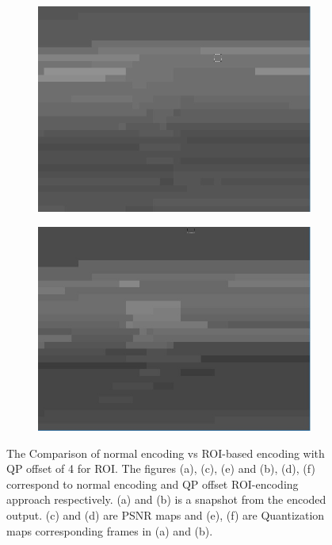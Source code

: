\documentclass[11pt]{article} %
\begin{document}
\begin{figure}
\begin{subfigure}[t]{0.45\textwidth}
		\includegraphics[width=\textwidth]{PaulDefault120_91250kbps_quant}
		\caption{}
	\label{fig:QP Offset Quant comparison 1}
	\end{subfigure}
	\begin{subfigure}[t]{0.45\textwidth}
		\centering
		\includegraphics[width=\textwidth]{QPOffset/paul120_250kbps_QPoffset4_quant}
		\caption{}
		\label {fig:QP Offset Quant comparison 2}
	\end{subfigure}
	\caption{The Comparison of normal encoding vs ROI-based encoding with QP offset of 4 for ROI. The figures (a), (c), (e) and  (b), (d), (f) correspond to normal encoding and QP offset ROI-encoding approach respectively. (a) and (b) is a snapshot from the encoded output. (c) and (d) are PSNR maps and (e), (f)  are Quantization maps corresponding frames in (a) and (b).}
	\label{fig:Default_QPOffsetCompare}
\end{figure}
\end{document}
